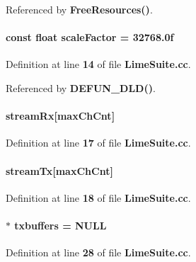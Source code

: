 Referenced by {\bf Free\+Resources()}.

\paragraph[{scale\+Factor}]{\setlength{\rightskip}{0pt plus 5cm}const float scale\+Factor = 32768.\+0f}\label{LimeSuite_8cc_acff94a5577c5386eb23a1788be62463a}


Definition at line {\bf 14} of file {\bf Lime\+Suite.\+cc}.



Referenced by {\bf D\+E\+F\+U\+N\+\_\+\+D\+L\+D()}.

\paragraph[{stream\+Rx}]{ stream\+Rx[{\bf max\+Ch\+Cnt}]}\label{LimeSuite_8cc_a11d0794dde3138c5dbec2571fe3768f6}


Definition at line {\bf 17} of file {\bf Lime\+Suite.\+cc}.

\paragraph[{stream\+Tx}]{ stream\+Tx[{\bf max\+Ch\+Cnt}]}\label{LimeSuite_8cc_aab7df223656caa0e951e16ffdadb212e}


Definition at line {\bf 18} of file {\bf Lime\+Suite.\+cc}.

\paragraph[{txbuffers}]{$\ast$ txbuffers = N\+U\+LL}\label{LimeSuite_8cc_adf30cee7147b3c3ba5055bef95772989}


Definition at line {\bf 28} of file {\bf Lime\+Suite.\+cc}.



